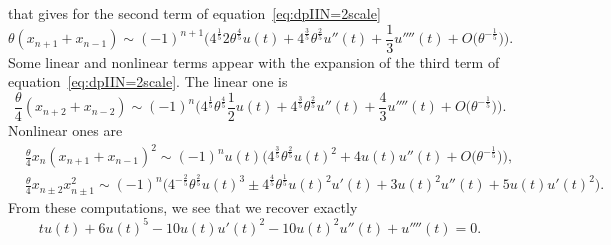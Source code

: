 \documentclass[pdftex]{sigma}%
\numberwithin{equation}{section}
\begin{document}
that gives for the second term of equation~\eqref{eq:dpIIN=2scale}
\begin{equation*}
	\theta(x_{n+1}+x_{n-1}) \sim (-1)^{n+1}\bigg(4^{\frac{1}{5}}2\theta^{\frac{4}{5}}u(t)+4^{\frac{3}{5}}\theta^{\frac{2}{5}}u''(t) +\frac{1}{3}u''''(t)+O\big(\theta^{-\frac{1}{5}}\big)\bigg).
\end{equation*}
Some linear and nonlinear terms appear with the expansion of the third term of equation~\eqref{eq:dpIIN=2scale}. The linear one is
\begin{equation*}
\frac{\theta}{4}(x_{n+2}+x_{n-2}) \sim (-1)^{n}\bigg(4^{\frac{1}{5}}\theta^{\frac{4}{5}}\frac{1}{2}u(t) +4^{\frac{3}{5}}\theta^{\frac{2}{5}}u''(t)+\frac{4}{3}u''''(t)+O\big(\theta^{-\frac{1}{5}}\big)\bigg).
\end{equation*}
Nonlinear ones are
\begin{align*}
&\frac{\theta}{4}x_n(x_{n+1}+x_{n-1})^2 \sim (-1)^{n} u(t)\big(4^{\frac{3}{5}}\theta^{\frac{2}{5}}u(t)^2+4 u(t)u''(t)+O\big(\theta^{-\frac{1}{5}}\big)\big),
\\
&\frac{\theta}{4}x_{n\pm 2}x_{n\pm 1}^2\sim(-1)^n\big(4^{-\frac{2}{5}}\theta^{\frac{2}{5}}u(t)^3\pm 4^{\frac{4}{5}}\theta^{\frac{1}{5}}u(t)^2u'(t)+3u(t)^2u''(t)+5u(t)u'(t)^2\big).
\end{align*}
From these computations, we see that we recover exactly
\begin{equation*}
t u(t) + 6 u(t)^5 - 10 u(t)u'(t)^2 -10 u(t)^2 u''(t) + u''''(t)=0.
\end{equation*}
\end{document}
